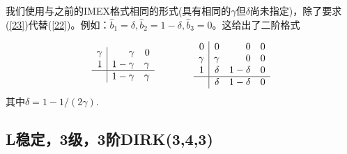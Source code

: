 \documentclass[12pt,a4paper]{article}
\begin{document}
我们使用与之前的IMEX格式相同的形式(具有相同的$\gamma$但$\delta$尚未指定)，除了要求(\ref{23})代替(\ref{22})。例如：$\widehat{b}_{1}=\delta,\widehat{b}_{2}=1-\delta,\widehat{b}_{3}=0$。这给出了二阶格式

\[
\begin{array}{r|rr}
\gamma & \gamma & 0\\
1 & 1-\gamma & \gamma \\
\hline
&1-\gamma & \gamma 
\end{array}~~~~~~~~~~~~
\begin{array}{r|rrr}
0 & 0 & 0 & 0 \\
\gamma & \gamma & 0 & 0\\
1 & \delta & 1-\delta & 0\\
\hline
& \delta & 1-\delta & 0
\end{array}
\]
其中$\delta=1-1/(2\gamma)$.

\subsection{L稳定，3级，3阶DIRK(3,4,3)}
\end{document}
